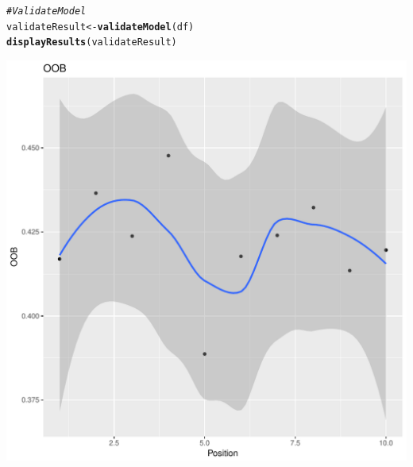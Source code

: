 \documentclass{article}\usepackage[]{graphicx}\usepackage[]{color}
\makeatletter
\def\maxwidth{ %
  \ifdim\Gin@nat@width>\linewidth
    \linewidth
  \else
    \Gin@nat@width
  \fi
}
\newcommand{\hlcom}[1]{\textcolor[rgb]{0.678,0.584,0.686}{\textit{#1}}}%
\newcommand{\hlstd}[1]{\textcolor[rgb]{0.345,0.345,0.345}{#1}}%
\newcommand{\hlkwb}[1]{\textcolor[rgb]{0.69,0.353,0.396}{#1}}%
\newcommand{\hlkwd}[1]{\textcolor[rgb]{0.737,0.353,0.396}{\textbf{#1}}}%
\newenvironment{kframe}{%
 \def\at@end@of@kframe{}%
 \ifinner\ifhmode%
  \def\at@end@of@kframe{\end{minipage}}%
  \begin{minipage}{\columnwidth}%
 \fi\fi%
 \def\FrameCommand##1{\hskip\@totalleftmargin \hskip-\fboxsep
 \colorbox{shadecolor}{##1}\hskip-\fboxsep
     \hskip-\linewidth \hskip-\@totalleftmargin \hskip\columnwidth}%
 \MakeFramed {\advance\hsize-\width
   \@totalleftmargin\z@ \linewidth\hsize
   \@setminipage}}%
 {\par\unskip\endMakeFramed%
 \at@end@of@kframe}
\newenvironment{knitrout}{}{} %
\makeatother
\begin{document}
\begin{knitrout}
\color{fgcolor}\begin{kframe}
\begin{alltt}
\hlcom{#Validate Model}
\hlstd{validateResult} \hlkwb{<-} \hlkwd{validateModel}\hlstd{(df)}
\hlkwd{displayResults}\hlstd{(validateResult)}
\end{alltt}


{\ttfamily\noindent\itshape\color{messagecolor}{\#\# `geom\_smooth()` using method = 'loess'}}\end{kframe}
\includegraphics[width=\maxwidth]{figure/unnamed-chunk-31-1} 
\begin{kframe}


\end{kframe}
\end{knitrout}
\end{document}
